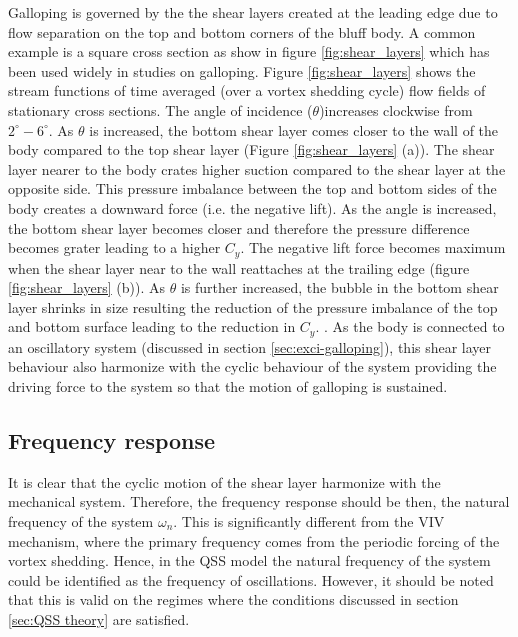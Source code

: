 Galloping is governed by the the shear layers created at the leading edge due to flow separation on the top and bottom corners of the bluff body. A common example is a square cross section as show in figure \ref{fig:shear_layers} which has been used widely in studies on galloping. Figure \ref{fig:shear_layers} shows the stream functions of time averaged (over a vortex shedding cycle) flow fields of stationary cross sections. The angle of incidence ($\theta$)increases clockwise from $2^{\circ}-6^{\circ}$. As $\theta$ is increased, the bottom shear layer comes closer to the wall of the body compared to the top shear layer (Figure \ref{fig:shear_layers} (a)). The shear layer nearer to the body crates higher suction compared to the shear layer at the opposite side. This pressure imbalance between the top and bottom sides of the body creates a downward force (i.e. the negative lift). As the angle is increased, the bottom shear layer becomes closer and therefore the pressure difference becomes grater leading to a higher $C_{y}$. The negative lift force becomes maximum when the shear layer near to the wall reattaches at the trailing edge (figure \ref{fig:shear_layers} (b)). As $\theta$ is further increased, the bubble in the bottom shear layer shrinks in size resulting the reduction of the pressure imbalance of the top and bottom surface leading to the reduction in $C_{y}$. . As the body is connected to an oscillatory system (discussed in section \ref{sec:exci-galloping}), this shear layer behaviour also harmonize with the cyclic behaviour of the system providing the driving force to the system so that the motion of galloping is sustained.



\subsection{Frequency response}
 
 It is clear that the cyclic motion of the shear layer harmonize with the mechanical system. Therefore, the frequency response should be then, the natural frequency of the system $\omega_{n}$. This is significantly different from the VIV mechanism, where the primary frequency comes from the periodic forcing of the vortex shedding. Hence, in the QSS model the natural frequency of the system could be identified as the frequency of oscillations. However, it should be  noted that this is valid on the regimes where the conditions discussed in section \ref{sec:QSS theory} are satisfied. 
 
